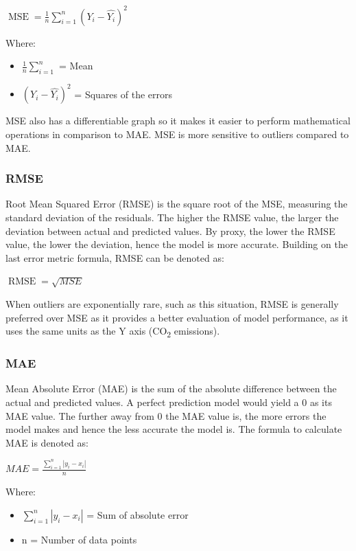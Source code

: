 \documentclass[12pt]{mcmthesis}
\begin{document}
    ${\operatorname {MSE} ={\frac {1}{n}}\sum _{i=1}^{n}\left(Y_{i}-{\hat {Y_{i}}}\right)^{2}}$

    Where:
    \begin{itemize}
        \item ${\frac {1}{n}\sum _{i=1}^{n}}$ = Mean
        \item ${\left(Y_{i}-{\hat {Y_{i}}}\right)^{2}}$ = Squares of the errors
    \end{itemize}

    MSE also has a differentiable graph so it makes it easier to perform mathematical operations in comparison to MAE. MSE is more sensitive to outliers compared to MAE\@.

    \subsubsection*{RMSE}
    Root Mean Squared Error (RMSE) is the square root of the MSE, measuring the standard deviation of the residuals. The higher the RMSE value, the larger the deviation between actual and predicted values. By proxy, the lower the RMSE value, the lower the deviation, hence the model is more accurate. Building on the last error metric formula, RMSE can be denoted as:

    ${\operatorname {RMSE} = \sqrt{MSE}}$

    When outliers are exponentially rare, such as this situation, RMSE is generally preferred over MSE as it provides a better evaluation of model performance, as it uses the same units as the Y axis (CO\textsubscript{2} emissions).

    \subsubsection*{MAE}
    Mean Absolute Error (MAE) is the sum of the absolute difference between the actual and predicted values. A perfect prediction model would yield a 0 as its MAE value. The further away from 0 the MAE value is, the more errors the model makes and hence the less accurate the model is. The formula to calculate MAE is denoted as:

    ${\displaystyle {MAE} ={\frac {\sum _{i=1}^{n}\left|y_{i}-x_{i}\right|}{n}}}$

    Where:
    \begin{itemize}
        \item ${\sum _{i=1}^{n}\left|y_{i}-x_{i}\right|}$ = Sum of absolute error
        \item {n} = Number of data points
    \end{itemize}
\end{document}
